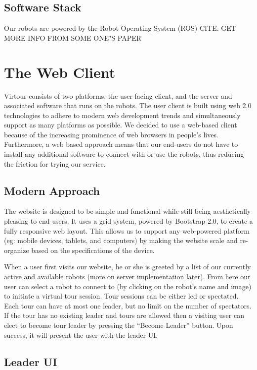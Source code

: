 \documentclass{sig-alternate-05-2015}
\begin{document}
\subsection{Software Stack}

Our robots are powered by the Robot Operating System (ROS) {CITE}. {GET MORE
INFO FROM SOME ONE"S PAPER}

\section{The Web Client}

Virtour consists of two platforms, the user facing client, and the server
and associated software that runs on the robots. The user client is built using
web 2.0 technologies to adhere to modern web development trends and
simultaneously support as many platforms as possible. We decided to use a
web-based client because of the increasing prominence of web browsers in
people's lives. Furthermore, a web based approach means that our end-users do
not have to install any additional software to connect with or use the robots,
thus reducing the friction for trying our service.

\subsection{Modern Approach}

The website is designed to be simple and functional while still being
aesthetically pleasing to end users. It uses a grid system, powered by
Bootstrap 2.0, to create a fully responsive web layout. This allows us to
support any web-powered platform (eg: mobile devices, tablets, and computers)
by making the website scale and re-organize based on the specifications of the
device.

When a user first visits our website, he or she is greeted by a list of our
currently active and available robots (more on server implementation later).
From here our user can select a robot to connect to (by clicking on the robot's
name and image) to initiate a virtual tour session. Tour sessions can be either
led or spectated. Each tour can have at most one leader, but no limit on the
number of spectators. If the tour has no existing leader and tours are allowed
then a visiting user can elect to become tour leader by pressing the ``Become
Leader'' button. Upon success, it will present the user with the leader UI.

\subsection{Leader UI}
\end{document}
